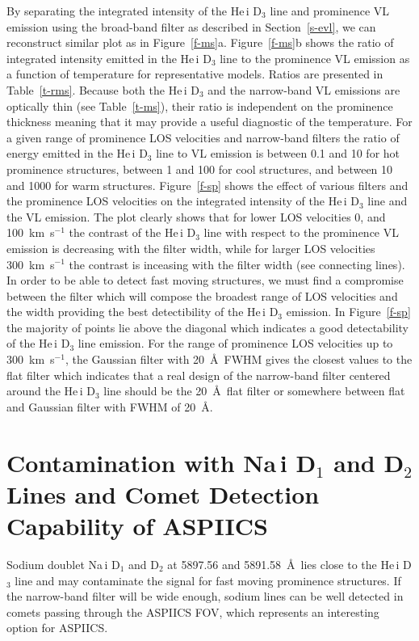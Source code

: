 \documentclass[namedreferences]{solarphysics}
\begin{document}
\begin{article}
By separating the integrated intensity of the He\,{\sc i} D$_{3}$ line and prominence VL emission using the broad-band filter as described in 
Section~\ref{s-evl}, we can reconstruct similar plot as in Figure~\ref{f-ms}a. Figure~\ref{f-ms}b shows the ratio of integrated intensity emitted in 
the  He\,{\sc i} D$_{3}$ line to the prominence VL emission as a function of temperature for representative models. Ratios are presented in 
Table~\ref{t-rms}. Because both the He\,{\sc i} D$_{3}$ and the narrow-band VL emissions are optically thin (see Table~\ref{t-ms}), their ratio is independent 
on the prominence thickness meaning that it may provide a useful diagnostic of the temperature. 
For a given range of prominence LOS velocities and narrow-band filters the ratio of energy emitted 
in the  He\,{\sc i} D$_{3}$ line to VL emission is between 0.1 and 10 for hot prominence structures, between 1 and 100 for cool structures, and between 10 and 1000 for warm structures.
Figure~\ref{f-sp} shows the effect of various filters and the prominence LOS velocities on the integrated intensity of the He\,{\sc i} D$_{3}$ line and the 
VL emission. The plot clearly shows that for lower LOS velocities 0, and 100~km~s$^{-1}$ the contrast of the He\,{\sc i} D$_{3}$ line with respect to the prominence VL 
emission is decreasing with the filter width, while for larger LOS velocities 300~km~s$^{-1}$ the contrast is inceasing with the filter width (see connecting lines). 
In order to be able to detect fast moving structures, we must find a compromise between the filter which will compose the broadest range of LOS velocities 
and the width providing the best detectibility of the He\,{\sc i} D$_{3}$ emission. In Figure~\ref{f-sp} the majority of points lie above the diagonal which 
indicates a good detectability of the He\,{\sc i} D$_{3}$ line emission. For the range of prominence LOS velocities up to 
300~km~s$^{-1}$, the Gaussian filter with 20~\AA~FWHM gives the closest values to the flat filter which indicates that a real design of the 
narrow-band filter centered around the He\,{\sc i} D$_{3}$ line should be the 20~\AA~flat filter or somewhere between flat and Gaussian filter with FWHM of 20~\AA.   


\section{Contamination with Na\,{\sc i} D$_1$ and D$_2$ Lines and Comet Detection Capability of ASPIICS}
	\label{s-d12}

Sodium doublet Na\,{\sc i} D$_{1}$ and  D$_{2}$ at 5897.56 and 5891.58~\AA~lies close to the 
He\,{\sc i} D${_3}$ line and may contaminate the signal 
for fast moving prominence structures. 
If the narrow-band filter will be wide enough, sodium lines can be well detected in comets passing through the ASPIICS FOV, which represents an interesting option for ASPIICS.


\end{article}
\end{document}
